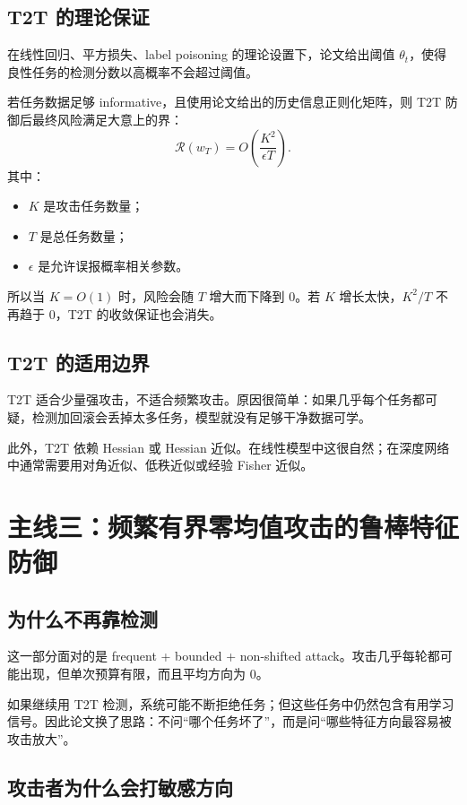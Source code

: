 \documentclass[UTF8,fontset=none,11pt]{ctexart}
\newcommand{\calR}{\mathcal{R}}
\begin{document}
\subsection{T2T 的理论保证}

在线性回归、平方损失、label poisoning 的理论设置下，论文给出阈值 \(\theta_t\)，使得良性任务的检测分数以高概率不会超过阈值。

若任务数据足够 informative，且使用论文给出的历史信息正则化矩阵，则 T2T 防御后最终风险满足大意上的界：
\[
  \calR(w_T)=O\!\left(\frac{K^2}{\epsilon T}\right).
\]
其中：
\begin{itemize}
  \item \(K\) 是攻击任务数量；
  \item \(T\) 是总任务数量；
  \item \(\epsilon\) 是允许误报概率相关参数。
\end{itemize}

所以当 \(K=O(1)\) 时，风险会随 \(T\) 增大而下降到 0。若 \(K\) 增长太快，\(K^2/T\) 不再趋于 0，T2T 的收敛保证也会消失。

\subsection{T2T 的适用边界}

T2T 适合少量强攻击，不适合频繁攻击。原因很简单：如果几乎每个任务都可疑，检测加回滚会丢掉太多任务，模型就没有足够干净数据可学。

此外，T2T 依赖 Hessian 或 Hessian 近似。在线性模型中这很自然；在深度网络中通常需要用对角近似、低秩近似或经验 Fisher 近似。

\section{主线三：频繁有界零均值攻击的鲁棒特征防御}

\subsection{为什么不再靠检测}

这一部分面对的是 frequent + bounded + non-shifted attack。攻击几乎每轮都可能出现，但单次预算有限，而且平均方向为 0。

如果继续用 T2T 检测，系统可能不断拒绝任务；但这些任务中仍然包含有用学习信号。因此论文换了思路：不问“哪个任务坏了”，而是问“哪些特征方向最容易被攻击放大”。

\subsection{攻击者为什么会打敏感方向}
\end{document}
